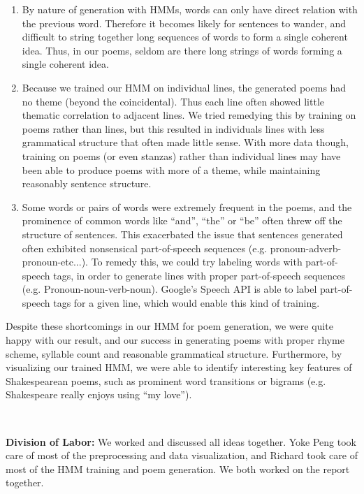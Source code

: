 \begin{enumerate}

\item By nature of generation with HMMs, words can only have direct relation with the previous word. Therefore it becomes likely for sentences to wander, and difficult to string together long sequences of words to form a single coherent idea. Thus, in our poems, seldom are there long strings of words forming a single coherent idea. 

\item Because we trained our HMM on individual lines, the generated poems had no theme (beyond the coincidental). Thus each line often showed little thematic correlation to adjacent lines. We tried remedying this by training on poems rather than lines, but this resulted in individuals lines with less grammatical structure that often made little sense. With more data though, training on poems (or even stanzas) rather than individual lines may have been able to produce poems with more of a theme, while maintaining reasonably sentence structure.

\item Some words or pairs of words were extremely frequent in the poems, and the prominence of common words like ``and'', ``the'' or ``be'' often threw off the structure of sentences. This exacerbated the issue that sentences generated often exhibited nonsensical part-of-speech sequences (e.g. pronoun-adverb-pronoun-etc...). To remedy this, we could try labeling words with part-of-speech tags, in order to generate lines with proper part-of-speech sequences (e.g. Pronoun-noun-verb-noun). Google's Speech API is able to label part-of-speech tags for a given line, which would enable this kind of training.

\end{enumerate}

Despite these shortcomings in our HMM for poem generation, we were quite happy with our result, and our success in generating poems with proper rhyme scheme, syllable count and reasonable grammatical structure. Furthermore, by visualizing our trained HMM, we were able to identify interesting key features of Shakespearean poems, such as prominent word transitions or bigrams (e.g. Shakespeare really enjoys using ``my love'').

~

\textbf{Division of Labor: } We worked and discussed all ideas together. Yoke Peng took care of most of the preprocessing and data visualization, and Richard took care of most of the HMM training and poem generation. We both worked on the report together.



